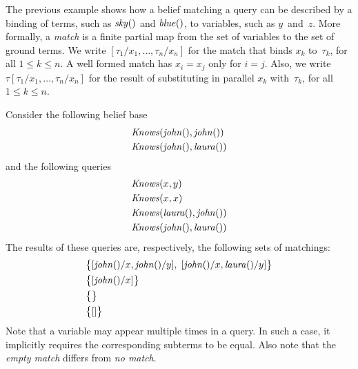 \documentclass[a4paper,12pt,oneside,fleqn]{book} %
\begin{document}
The previous example shows how a belief matching a query can be described
by a binding of terms, such as ${\it sky}()$ and ${\it blue}()$, to
variables, such as $y$~and~$z$.  More formally, a \emph{match} is a finite
partial map from the set of variables to the set of ground terms.  We write
$[\tau_1/x_1,\ldots,\tau_n/x_n]$ for the match that binds $x_k$
to~$\tau_k$, for all $1\le k\le n$. A well formed match has $x_i=x_j$ only
for $i=j$.  Also, we write $\tau[\tau_1/x_1,\ldots,\tau_n/x_n]$ for the
result of substituting in parallel $x_k$ with~$\tau_k$, for all $1\le k\le
n$.

\begin{example} Consider the following belief base \begin{align} &{\it
Knows}({\it john}(), {\it john}()) \\ &{\it Knows}({\it john}(), {\it
laura}()) \end{align} and the following queries \begin{align} &{\it
Knows}(x, y) \\ &{\it Knows}(x, x) \\ &{\it Knows}({\it laura}(), {\it
john}()) \\ &{\it Knows}({\it john}(), {\it laura}()) \end{align} The
results of these queries are, respectively, the following sets of
matchings: \begin{align} &\bigl\{ [{\it john}()/x, {\it john}()/y],\; [{\it
john}()/x,{\it laura}()/y] \bigr\} \\ &\bigl\{ [{\it john}()/x] \bigr\} \\
&\bigl\{\bigr\} \\ &\bigl\{[]\bigr\} \end{align} Note that a variable may
appear multiple times in a query.  In such a case, it implicitly requires
the corresponding subterms to be equal.  Also note that the \emph{empty
match} differs from \emph{no match}.
\end{example}
\end{document}
